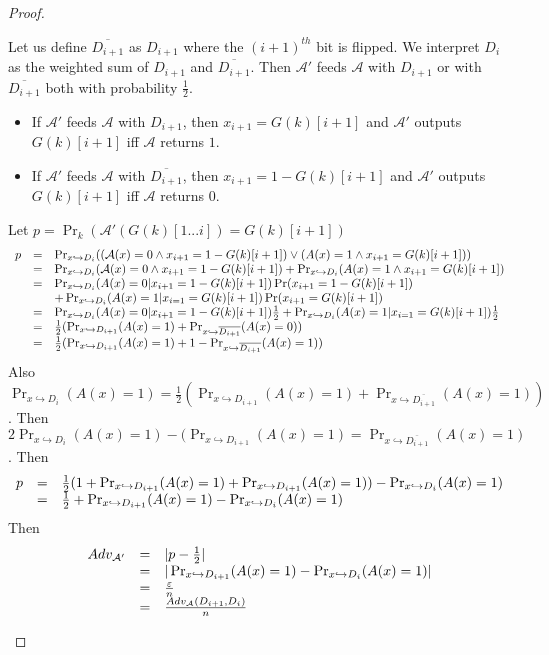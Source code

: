 \documentclass{article}
\newcommand{\A}{\mathcal{A}}
\renewcommand{\epsilon}{\varepsilon}
\begin{document}
\begin{proof}
\begin{itemize}
Let us define $\overline{D_{i+1}}$ as $D_{i+1}$ where the $(i+1)^{th}$ bit is flipped. We interpret $D_i$ as the weighted sum of $D_{i+1}$ and $\overline{D_{i+1}}$. Then $\A'$ feeds $\A$ with $D_{i+1}$ or with $\overline{D_{i+1}}$ both with probability $\frac{1}{2}$.
\begin{itemize}
\item If $\A'$ feeds $\A$ with $D_{i+1}$, then $x_{i+1}=G(k)[i+1]$ and $\A'$ outputs $G(k)[i+1]$ iff $\A$ returns $1$.
\item If $\A'$ feeds $\A$ with $\overline{D_{i+1}}$, then $x_{i+1}=1-G(k)[i+1]$ and $\A'$ outputs $G(k)[i+1]$ iff $\A$ returns $0$.
\end{itemize}
Let $p=\Pr_k(\A'(G(k)[1...i])=G(k)[i+1])$
\[\begin{array}{r c l}
p &=& \Pr_{x\hookrightarrow D_i}((\A(x)=0\wedge x_{i+1}=1-G(k)[i+1])\vee(A(x)=1\wedge x_{i+1}=G(k)[i+1]))\\
&=& \Pr_{x\hookrightarrow D_i}(\A(x)=0\wedge x_{i+1}=1-G(k)[i+1])+\Pr_{x\hookrightarrow D_i}(A(x)=1\wedge x_{i+1}=G(k)[i+1])\\
&=& \Pr_{x\hookrightarrow D_i}(A(x)=0|x_{i+1}=1-G(k)[i+1])\Pr(x_{i+1}=1-G(k)[i+1])\\
&& +\Pr_{x\hookrightarrow D_i}(A(x)=1|x_{i=1}=G(k)[i+1])\Pr(x_{i+1}=G(k)[i+1]) \\
&=& \Pr_{x\hookrightarrow D_i}(A(x)=0|x_{i+1}=1-G(k)[i+1])\frac{1}{2} 	+\Pr_{x\hookrightarrow D_i}(A(x)=1|x_{i=1}=G(k)[i+1])\frac{1}{2}\\
&=& \frac{1}{2}(\Pr_{x\hookrightarrow D_{i+1}}(A(x)=1)+\Pr_{x\hookrightarrow\overline{D_{i+1}}}(A(x)=0))\\
&=& \frac{1}{2}(\Pr_{x\hookrightarrow D_{i+1}}(A(x)=1)+1-\Pr_{x\hookrightarrow\overline{D_{i+1}}}(A(x)=1))
\end{array}\]
Also $\Pr_{x\hookrightarrow D_i}(A(x)=1)=\frac{1}{2}(\Pr_{x\hookrightarrow D_{i+1}}(A(x)=1)+\Pr_{x\hookrightarrow\overline{D_{i+1}}}(A(x)=1))$. Then  $2\Pr_{x\hookrightarrow D_i}(A(x)=1)-(\Pr_{x\hookrightarrow D_{i+1}}(A(x)=1)=\Pr_{x\hookrightarrow\overline{D_{i+1}}}(A(x)=1)$. Then 
\[\begin{array}{r c l}
p &=& \frac{1}{2}(1+\Pr_{x\hookrightarrow D_{i+1}}(A(x)=1)+\Pr_{x\hookrightarrow D_{i+1}}(A(x)=1))-\Pr_{x\hookrightarrow D_i}(A(x)=1)\\
&=& \frac{1}{2} + \Pr_{x\hookrightarrow D_{i+1}}(A(x)=1)-\Pr_{x\hookrightarrow D_i}(A(x)=1)
\end{array}
\]
Then
\[\begin{array}{r c l}
Adv_{\A'} &=& |p-\frac{1}{2}|\\
&=& |\Pr_{x\hookrightarrow D_{i+1}}(A(x)=1)-\Pr_{x\hookrightarrow D_i}(A(x)=1)|\\
&=& \frac{\epsilon}{n}\\
&=& \frac{Adv_\A(D_{i+1},D_i)}{n}
\end{array}\]
\end{itemize}
\end{proof}
\end{document}
